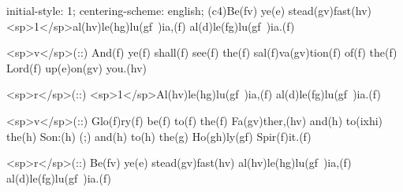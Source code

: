 initial-style: 1;
centering-scheme: english;
(c4)Be(fv) ye(e) stead(gv)fast(hv) <sp>1</sp>al(hv)le(hg)lu(gf~)ia,(f) al(d)le(fg)lu(gf~)ia.(f)

<sp>v</sp>(::) And(f) ye(f) shall(f) see(f) the(f) sal(f)va(gv)tion(f) of(f) the(f) Lord(f) up(e)on(gv) you.(hv)

<sp>r</sp>(::) <sp>1</sp>Al(hv)le(hg)lu(gf~)ia,(f) al(d)le(fg)lu(gf~)ia.(f)

<sp>v</sp>(::) Glo(f)ry(f) be(f) to(f) the(f) Fa(gv)ther,(hv) and(h) to(ixhi) the(h) Son:(h) (;) and(h) to(h) the(g) Ho(gh)ly(gf) Spir(f)it.(f)

<sp>r</sp>(::) Be(fv) ye(e) stead(gv)fast(hv) al(hv)le(hg)lu(gf~)ia,(f) al(d)le(fg)lu(gf~)ia.(f)